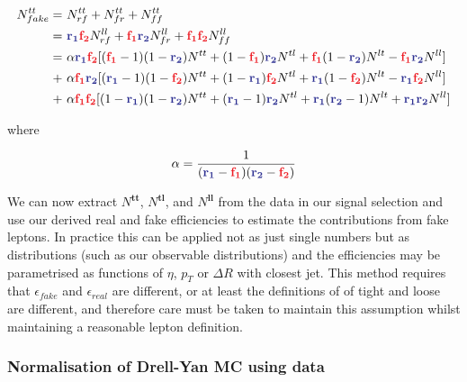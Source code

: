 \begin{align}
N^{tt}_{fake} =&~ N^{tt}_{rf} + N^{tt}_{fr} + N^{tt}_{ff} \\
              =&~ \rone \ftwo N^{ll}_{rf} + \fone \rtwo N^{ll}_{fr} + \fone \ftwo N^{ll}_{ff} \\
              =&~ \alpha \rone \ftwo [(\fone -1)(1-\rtwo )N^{tt} + (1-\fone )\rtwo N^{tl} + \fone (1-\rtwo )N^{lt} - \fone \rtwo N^{ll}] \nonumber \\
               +&~ \alpha \fone \rtwo [(\rone -1)(1-\ftwo )N^{tt} + (1-\rone )\ftwo N^{tl} + \rone (1-\ftwo )N^{lt} - \rone \ftwo N^{ll}] \nonumber \\
               +&~ \alpha \fone \ftwo [(1-\rone )(1-\rtwo )N^{tt} + (\rone - 1)\rtwo N^{tl} + \rone (\rtwo  -1)N^{lt} + \rone \rtwo N^{ll}]
\end{align}

where

\begin{equation*}
\alpha = \frac{1}{(\rone - \fone )(\rtwo -\ftwo )}
\end{equation*}

We can now extract $N^{\mathbf{tt}}$, $N^{\mathbf{tl}}$, and $N^{\mathbf{ll}}$ from the data in our signal selection and use our derived real and fake efficiencies to estimate the contributions from fake leptons. In practice this can be applied not as just single numbers but as distributions (such as our observable distributions) and the efficiencies may be parametrised as functions of $\eta$, $p_T$ or $\Delta R$ with closest jet. This method requires that $\epsilon_{fake}$ and $\epsilon_{real}$ are different, or at least the definitions of of tight and loose are different, and therefore care must be taken to maintain this assumption whilst maintaining a reasonable lepton definition.

\subsubsection*{Normalisation of Drell-Yan MC using data}
\label{sec:drell_yan}

